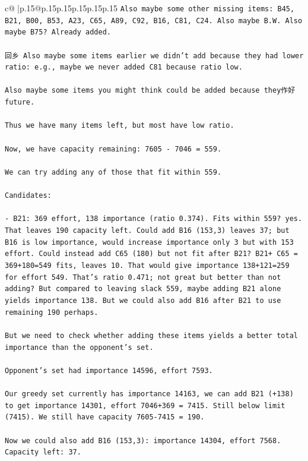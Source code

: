 \documentclass{article}
\begin{document}
{\begin{supertabular}{c@{$\;$}|p{.15\linewidth}@{}p{.15\linewidth}p{.15\linewidth}p{.15\linewidth}p{.15\linewidth}p{.15\linewidth}}
{{{\texttt{Also maybe some other missing items: B45, B21, B00, B53, A23, C65, A89, C92, B16, C81, C24. Also maybe B.W. Also maybe B75? Already added.} \\
\\ 
\texttt{回乡 Also maybe some items earlier we didn't add because they had lower ratio: e.g., maybe we never added C81 because ratio low.} \\
\\ 
\texttt{Also maybe some items you might think could be added because they作好 future.} \\
\\ 
\texttt{Thus we have many items left, but most have low ratio.} \\
\\ 
\texttt{Now, we have capacity remaining: 7605 {-} 7046 = 559.} \\
\\ 
\texttt{We can try adding any of those that fit within 559.} \\
\\ 
\texttt{Candidates:} \\
\\ 
\texttt{{-} B21: 369 effort, 138 importance (ratio 0.374). Fits within 559? yes. That leaves 190 capacity left. Could add B16 (153,3) leaves 37; but B16 is low importance, would increase importance only 3 but with 153 effort. Could instead add C65 (180) but not fit after B21? B21+ C65 = 369+180=549 fits, leaves 10. That would give importance 138+121=259 for effort 549. That's ratio 0.471; not great but better than not adding? But compared to leaving slack 559, maybe adding B21 alone yields importance 138. But we could also add B16 after B21 to use remaining 190 perhaps.} \\
\\ 
\texttt{But we need to check whether adding these items yields a better total importance than the opponent's set.} \\
\\ 
\texttt{Opponent's set had importance 14596, effort 7593.} \\
\\ 
\texttt{Our greedy set currently has importance 14163, we can add B21 (+138) to get importance 14301, effort 7046+369 = 7415. Still below limit (7415). We still have capacity 7605{-}7415 = 190.} \\
\\ 
\texttt{Now we could also add B16 (153,3): importance 14304, effort 7568. Capacity left: 37.} \\
}}}
\end{supertabular}}
\end{document}
